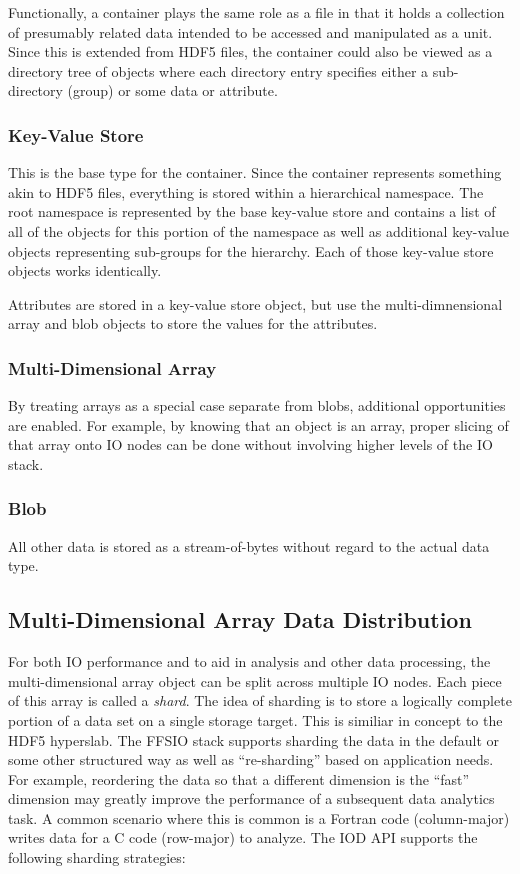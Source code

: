 \documentclass[conference]{IEEEtran}
\begin{document}
Functionally, a container plays the same role as a file in that it holds a
collection of presumably related data intended to be accessed and manipulated
as a unit. Since this is extended from HDF5 files, the container could also be
viewed as a directory tree of objects where each directory entry specifies
either a sub-directory (group) or some data or attribute.

\subsubsection{Key-Value Store}
This is the base type for the container. Since the container represents
something akin to HDF5 files, everything is stored within a hierarchical
namespace. The root namespace is represented by the base key-value store and
contains a list of all of the objects for this portion of the namespace as well
as additional key-value objects representing sub-groups for the hierarchy. Each
of those key-value store objects works identically.

Attributes are stored in a key-value store object, but use the
multi-dimnensional array and blob objects to store the values for the
attributes.

\subsubsection{Multi-Dimensional Array}
By treating arrays as a special case separate from blobs, additional
opportunities are enabled. For example, by knowing that an object is an array,
proper slicing of that array onto IO nodes can be done without involving higher
levels of the IO stack.

\subsubsection{Blob}
All other data is stored as a stream-of-bytes without regard to the actual
data type.

\subsection{Multi-Dimensional Array Data Distribution}

For both IO performance and to aid in analysis and other data processing, the
multi-dimensional array object can be split across multiple IO nodes. Each
piece of this array is called a {\em shard}.  The idea of sharding is to store
a logically complete portion of a data set on a single storage target. This is
similiar in concept to the HDF5 hyperslab.  The FFSIO stack supports sharding
the data in the default or some other structured way as well as ``re-sharding''
based on application needs. For example, reordering the data so that a
different dimension is the ``fast'' dimension may greatly improve the
performance of a subsequent data analytics task. A common scenario where this
is common is a Fortran code (column-major) writes data for a C code (row-major)
to analyze.  The IOD API supports the following sharding strategies:
\end{document}
